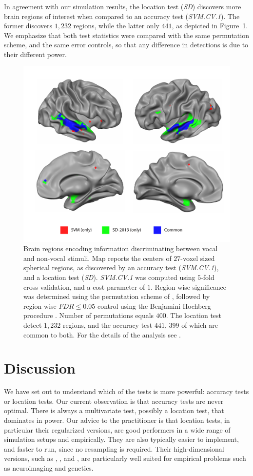 \documentclass[12pt,a4paper]{article}
\begin{document}
In agreement with our simulation results, the location test (\emph{SD}) discovers more brain regions of interest when compared to an accuracy test (\emph{SVM.CV.1}).
The former discovers $1,232$ regions, while the latter only $441$, as depicted in Figure~\ref{fig:read_data}.
We emphasize that both test statistics were compared with the same permutation scheme, and the same error controls, so that any difference in detections is due to their different power.


\begin{figure}[th]
\centering
\includegraphics[width=0.5\linewidth]{"art/svm_vs_SD"}
\caption{\footnotesize
Brain regions encoding information discriminating between vocal and non-vocal stimuli.
Map reports the centers of $27$-voxel sized spherical regions, as discovered by an accuracy test (\emph{SVM.CV.1}), and a location test (\emph{SD}). 
\emph{SVM.CV.1} was computed using $5$-fold cross validation, and a cost parameter of $1$. 
Region-wise significance was determined using the permutation scheme of \cite{stelzer_statistical_2013}, followed by region-wise $FDR \leq 0.05$ control using the Benjamini-Hochberg procedure \citep{benjamini_controlling_1995}.
Number of permutations equals $400$.
The location test detect $1,232$ regions, and the accuracy test $441$, $399$ of which are common to both.
For the details of the analysis see \cite{gilron_quantifying_2016}.  
  }
\label{fig:read_data}
\end{figure}








\section{Discussion}
\label{sec:discussion}

We have set out to understand which of the tests is more powerful: accuracy tests or location tests. 
Our current observation is that accuracy tests are never optimal.
There is always a multivariate test, possibly a location test, that dominates in power. 
Our advice to the practitioner is that location tests, in particular their regularized versions, are good performers in a wide range of simulation setups and empirically. 
They are also typically easier to implement, and faster to run, since no resampling is required. 
Their high-dimensional versions, such as \cite{schafer_shrinkage_2005}, \cite{goeman2006testing}, and \cite{srivastava_multivariate_2007}, are particularly well suited for empirical problems such as neuroimaging and genetics.
\end{document}
